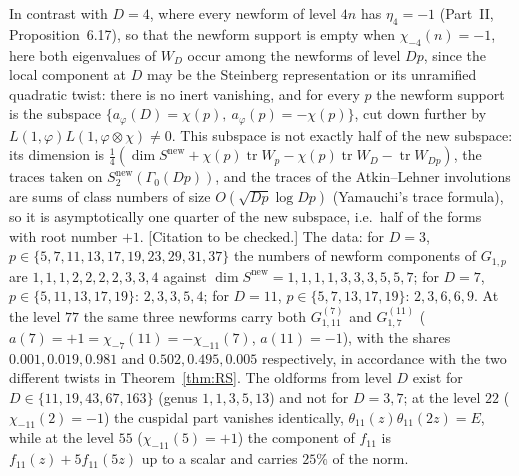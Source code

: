 \documentclass[11pt]{amsart}
\theoremstyle{remark}
\begin{document}
In contrast with $D=4$, where every newform of level $4n$ has $\eta_4=-1$ (Part~II, Proposition~6.17), so that the newform support is empty when $\chi_{-4}(n)=-1$, here both eigenvalues of $W_D$ occur among the newforms of level $Dp$, since the local component at $D$ may be the Steinberg representation or its unramified quadratic twist: there is no inert vanishing, and for every $p$ the newform support is the subspace $\{a_\varphi(D)=\chi(p),\ a_\varphi(p)=-\chi(p)\}$, cut down further by $L(1,\varphi)L(1,\varphi\otimes\chi)\ne0$. This subspace is not exactly half of the new subspace: its dimension is $\frac14(\dim S^{\mathrm{new}}+\chi(p)\operatorname{tr}W_p-\chi(p)\operatorname{tr}W_D-\operatorname{tr}W_{Dp})$, the traces taken on $S_2^{\mathrm{new}}(\Gamma_0(Dp))$, and the traces of the Atkin--Lehner involutions are sums of class numbers of size $O(\sqrt{Dp}\log Dp)$ (Yamauchi's trace formula), so it is asymptotically one quarter of the new subspace, i.e.\ half of the forms with root number $+1$. [Citation to be checked.] The data: for $D=3$, $p\in\{5,7,11,13,17,19,23,29,31,37\}$ the numbers of newform components of $G_{1,p}$ are $1,1,1,2,2,2,2,3,3,4$ against $\dim S^{\mathrm{new}}=1,1,1,1,3,3,3,5,5,7$; for $D=7$, $p\in\{5,11,13,17,19\}$: $2,3,3,5,4$; for $D=11$, $p\in\{5,7,13,17,19\}$: $2,3,6,6,9$. At the level $77$ the same three newforms carry both $G^{(7)}_{1,11}$ and $G^{(11)}_{1,7}$ ($a(7)=+1=\chi_{-7}(11)=-\chi_{-11}(7)$, $a(11)=-1$), with the shares $0.001,0.019,0.981$ and $0.502,0.495,0.005$ respectively, in accordance with the two different twists in Theorem~\ref{thm:RS}. The oldforms from level $D$ exist for $D\in\{11,19,43,67,163\}$ (genus $1,1,3,5,13$) and not for $D=3,7$; at the level $22$ ($\chi_{-11}(2)=-1$) the cuspidal part vanishes identically, $\theta_{11}(z)\theta_{11}(2z)=E$, while at the level $55$ ($\chi_{-11}(5)=+1$) the component of $f_{11}$ is $f_{11}(z)+5f_{11}(5z)$ up to a scalar and carries $25\%$ of the norm.
\end{document}
